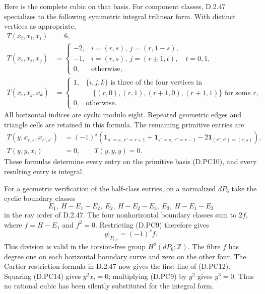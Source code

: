 Here is the complete cubic on that basis. For component classes,
D.2.47 specializes to the following symmetric integral trilinear
form. With distinct vertices as appropriate,
\[
 \begin{aligned}
 T(x_i,x_i,x_i)&=6,\\
 T(x_i,x_i,x_j)&=
 \begin{cases}
 -2,&i=(r,s),\ j=(r,1-s),\\
 -1,&i=(r,s),\ j=(r\pm1,t),\quad t=0,1,\\
 0,&\text{otherwise},
 \end{cases}\\
 T(x_i,x_j,x_k)&=
 \begin{cases}
 1,&\{i,j,k\}\text{ is three of the four vertices in}\\[-2pt]
   &\hspace{12pt}\{(r,0),(r,1),(r+1,0),(r+1,1)\}
                   \text{ for some }r,\\
 0,&\text{otherwise}.
 \end{cases}
 \end{aligned}                                             \tag{D.PC11}
\]
All horizontal indices are cyclic modulo eight. Repeated geometric
edges and triangle cells are retained in this formula.
The remaining primitive entries are
\[
 \begin{aligned}
 T(y,x_{r,s},x_{r',s'})
 &=(-1)^s\left(
       \mathbf1_{s'=s,\ r'=r+1}
      +\mathbf1_{s'=s,\ r'=r-1}
      -2\mathbf1_{(r',s')=(r,s)}\right),\\
 T(y,y,x_i)&=0,\qquad T(y,y,y)=0.
 \end{aligned}                                             \tag{D.PC12}
\]
These formulas determine every entry on the primitive basis
(D.PC10), and every resulting entry is integral.

For a geometric verification of the half-class entries, on a
normalized $dP_6$ take the cyclic boundary classes
\[
 E_1,\ H-E_1-E_2,\ E_2,\ H-E_2-E_3,\ E_3,\ H-E_1-E_3
                                                               \tag{D.PC13}
\]
in the ray order of D.2.47. The four nonhorizontal boundary classes
sum to $2f$, where $f=H-E_1$ and $f^2=0$. Restricting (D.PC9)
therefore gives
\[
                         y|_{P_{r,s}}=(-1)^s f.            \tag{D.PC14}
\]
This division is valid in the torsion-free group $H^2(dP_6;\mathbb Z)$.
The fibre $f$ has degree one on each horizontal boundary curve
and zero on the other four. The Cartier restriction formula in
D.2.47 now gives the first line of (D.PC12). Squaring (D.PC14)
gives $y^2x_i=0$; multiplying (D.PC9) by $y^2$ gives $y^3=0$.
Thus no rational cubic has been silently substituted for the
integral form.

